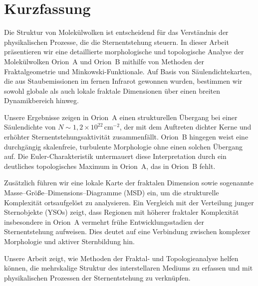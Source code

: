 \chapter{Kurzfassung}

Die Struktur von Molekülwolken ist entscheidend für das Verständnis der physikalischen Prozesse, die die Sternentstehung steuern. In dieser Arbeit präsentieren wir eine detaillierte morphologische und topologische Analyse der Molekülwolken Orion~A und Orion~B mithilfe von Methoden der Fraktalgeometrie und Minkowski-Funktionale. Auf Basis von Säulendichtekarten, die aus Staubemissionen im fernen Infrarot gewonnen wurden, bestimmen wir sowohl globale als auch lokale fraktale Dimensionen über einen breiten Dynamikbereich hinweg.

Unsere Ergebnisse zeigen in Orion~A einen strukturellen Übergang bei einer Säulendichte von $N \sim 1{,}2 \times 10^{22} \,\mathrm{cm}^{-2}$, der mit dem Auftreten dichter Kerne und erhöhter Sternentstehungsaktivität zusammenfällt. Orion~B hingegen weist eine durchgängig skalenfreie, turbulente Morphologie ohne einen solchen Übergang auf. Die Euler-Charakteristik untermauert diese Interpretation durch ein deutliches topologisches Maximum in Orion~A, das in Orion~B fehlt. 

Zusätzlich führen wir eine lokale Karte der fraktalen Dimension sowie sogenannte Masse–Größe–Dimensions–Diagramme (MSD) ein, um die strukturelle Komplexität ortsaufgelöst zu analysieren. Ein Vergleich mit der Verteilung junger Sternobjekte (YSOs) zeigt, dass Regionen mit höherer fraktaler Komplexität insbesondere in Orion~A vermehrt frühe Entwicklungsstadien der Sternentstehung aufweisen. Dies deutet auf eine Verbindung zwischen komplexer Morphologie und aktiver Sternbildung hin.

Unsere Arbeit zeigt, wie Methoden der Fraktal- und Topologieanalyse helfen können, die mehrskalige Struktur des interstellaren Mediums zu erfassen und mit physikalischen Prozessen der Sternentstehung zu verknüpfen.

\clearpage